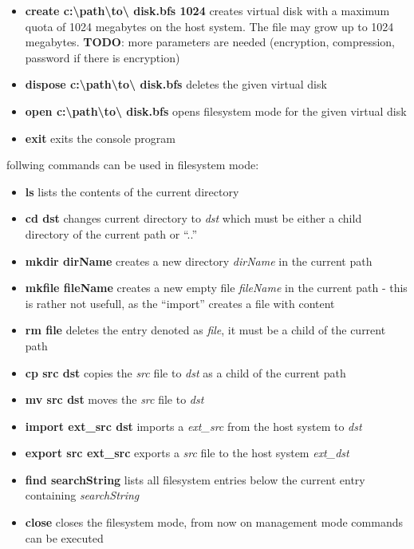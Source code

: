 \begin{itemize}
  \item{\textbf{create c:\textbackslash path\textbackslash to\textbackslash
  disk.bfs 1024}} creates virtual disk with a maximum quota of 1024 megabytes on the host system. The file may grow up to 1024 megabytes.
  \textbf{TODO}: more parameters are needed (encryption, compression, password if there is encryption)
  \item {\textbf{dispose c:\textbackslash path\textbackslash to\textbackslash
  disk.bfs}} deletes the given virtual disk
  \item {\textbf{open c:\textbackslash path\textbackslash to\textbackslash
  disk.bfs}} opens filesystem mode for the given virtual disk
  \item {\textbf{exit}} exits the console program
\end{itemize}

follwing commands can be used in filesystem mode:

\begin{itemize}
  \item {\textbf{ls}} lists the contents of the current directory
  \item {\textbf{cd dst}} changes current directory to \textit{dst} which must
  be either a child directory of the current path or ``..''
  \item {\textbf{mkdir dirName}} creates a new directory \textit{dirName} in the
  current path
  \item {\textbf{mkfile fileName}} creates a new empty file \textit{fileName} in
  the current path - this is rather not usefull, as the ``import'' creates a
  file with content
  \item {\textbf{rm file}} deletes the entry denoted as \textit{file}, it must
  be a child of the current path
  \item {\textbf{cp src dst}} copies the \textit{src} file to \textit{dst} as a
  child of the current path
  \item {\textbf{mv src dst}} moves the \textit{src} file to \textit{dst}
  \item {\textbf{import ext\_src dst}} imports a \textit{ext\_src} from the
  host system to \textit{dst}
  \item {\textbf{export src ext\_src}} exports a \textit{src} file to the host
  system \textit{ext\_dst}
  \item {\textbf{find searchString}} lists all filesystem entries below the
  current entry containing \textit{searchString}
  \item {\textbf{close}} closes the filesystem mode, from now on management mode
  commands can be executed
\end{itemize}



